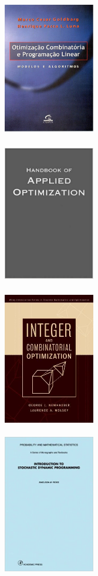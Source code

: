 \documentclass{beamer}
\begin{document}
\begin{frame}
{
	\begin{figure}[!htb]
		\includegraphics[width=4cm, height=6cm]{goldberg.jpg}
	\end{figure}
}

{
	\begin{figure}[!htb]
		\includegraphics[width=4cm, height=6cm]{handbookofappliedoptmization.jpg}
	\end{figure}
}

{
	\begin{figure}[!htb]
		\includegraphics[width=4cm, height=6cm]{integerandcombinatorial.jpg}
	\end{figure}
}


{
	\begin{figure}[!htb]
		\includegraphics[width=4cm, height=6cm]{introductiontosdp.jpg}
	\end{figure}
}


\end{frame}
\end{document}
